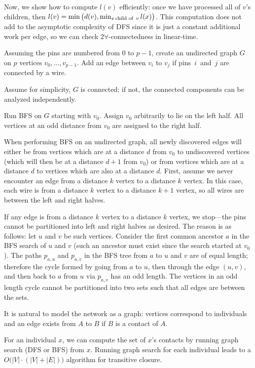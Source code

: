  Now, we show how to compute $l(v)$ efficiently: once we have processed all of $v$'s children,
 then $l(v) = \min\big(d(v), \min_{x \, \mbox{\scriptsize child of } \,v} l(x) \big)$.  This computation
 does not add to the asymptotic complexity of DFS since it is just a constant
 additional work per edge, so we can check $2\forall$-connectedness in linear-time.

Assuming the pins are numbered from $0$ to $p-1$,
create an undirected graph $G$ on $p$ vertices $v_0,\ldots,v_{p-1}$.
Add an edge between $v_i$ to $v_j$ if pins~$i$~and~$j$ are connected by a wire.

Assume for simplicity, $G$ is connected; if not, the connected components can
be analyzed independently.

Run BFS on $G$ starting with $v_0$. Assign $v_0$ arbitrarily to lie on the left
half.  All vertices at an odd distance from $v_0$ are assigned to the right half.


When performing BFS on an undirected graph, all newly discovered edges will
either be from vertices which are at a distance $d$ from $v_0$ to undiscovered vertices (which will
then be at a distance $d+1$ from $v_0$) or from vertices which are at a
distance $d$ to vertices which are also at a distance $d$. First, assume we never encounter an edge from
a distance $k$ vertex to a distance $k$ vertex. In this case,
each wire is from a distance $k$ vertex to a distance $k+1$ vertex, so all wires are between
the left and right halves.

If any edge is from a distance $k$ vertex to a distance $k$ vertex,
we stop---the pins cannot be partitioned into left and right halves as desired.
The reason is as follows:  let $u$ and $v$ be
such vertices. Consider the first common ancestor $a$ in the BFS search of $u$ and $v$ (such an
ancestor must exist since the search started at $v_0$).  The paths $p_{a,u}$ and $p_{a,v}$ in the BFS tree from $a$ to $u$ and $v$ are
of equal length; therefore the cycle formed by going from $a$ to $u$, then through the edge $(u,v)$, and then back to $a$ from $u$ via
$p_{a,v}$ has an odd length.  The vertices in an odd length cycle cannot be partitioned into two sets such that all edges
are between the sets.



It is natural to model the network as a graph: vertices correspond
to individuals and an edge exists from $A$ to $B$ if $B$ is a contact of $A$.

For an individual $x$, we can compute the set of $x$'s contacts by running graph search 
(DFS or BFS) from $x$.  Running graph search for each individual leads
to a $O\big(| V |\cdot ( |V| +|E|)\big)$ algorithm for transitive closure.

